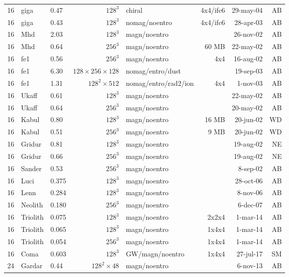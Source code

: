 \documentclass[\mydriver,12pt,twoside,notitlepage,a4paper]{article}
\begin{document}
\begin{center}
\begin{footnotesize}
\begin{longtable}{rllrlrrr}
  16 & giga  & 0.47 & $128^3$ & chiral       &4x4/ifc6& 29-may-04 & AB \\
  16 & giga  & 0.43 & $128^3$ & nomag/noentro&4x4/ifc6& 28-apr-03 & AB \\
  16 & Mhd   & 2.03 & $128^3$ & magn/noentro &        & 26-nov-02 & AB \\
  16 & Mhd   & 0.64 & $256^3$ & magn/noentro &  60 MB & 22-may-02 & AB \\
  16 & fe1   & 0.56 & $256^3$ & magn/noentro &  4x4   & 16-aug-02 & AB \\
  16 & fe1   & 6.30 & $128{\!\times\!}256{\!\times\!}128$
                              & nomag/entro/dust &    & 19-sep-03 & AB \\
  16 & fe1   & 1.31 & $128^2{\!\times\!}512$
                     & nomag/entro/rad2/ion &  4x4   &  1-nov-03 & AB \\
  16 & Ukaff & 0.61 & $128^3$ & magn/noentro &        & 22-may-02 & AB \\
  16 & Ukaff & 0.64 & $256^3$ & magn/noentro &        & 20-may-02 & AB \\
  16 & Kabul & 0.80 & $128^3$ & magn/noentro &  16 MB & 20-jun-02 & WD \\
  16 & Kabul & 0.51 & $256^3$ & magn/noentro &   9 MB & 20-jun-02 & WD \\
  16 & Gridur& 0.81 & $128^3$ & magn/noentro &        & 19-aug-02 & NE \\
  16 & Gridur& 0.66 & $256^3$ & magn/noentro &        & 19-aug-02 & NE \\
  16 & Sander& 0.53 & $256^3$ & magn/noentro &        &  8-sep-02 & AB \\
  16 & Luci  & 0.375& $128^3$ & magn/noentro &        & 28-oct-06 & AB \\
  16 & Lenn  & 0.284& $128^3$ & magn/noentro &        &  8-nov-06 & AB \\
  16 &Neolith& 0.180& $256^3$ & magn/noentro &        &  6-dec-07 & AB \\
  16 &Triolith&0.075& $128^3$ & magn/noentro & 2x2x4  &  1-mar-14 & AB \\
  16 &Triolith&0.065& $128^3$ & magn/noentro & 1x4x4  &  1-mar-14 & AB \\
  16 &Triolith&0.054& $256^3$ & magn/noentro & 1x4x4  &  1-mar-14 & AB \\
  16 &Coma & 0.603 & $128^3$ & GW/magn/noentro & 1x4x4  & 27-jul-17 & SM \\
  24 &Gardar & 0.44 & $128^2\times48$ & magn/noentro &        & 6-nov-13 & AB \\

\end{longtable}
\end{footnotesize}
\end{center}
\end{document}

